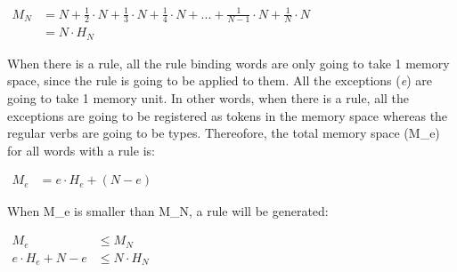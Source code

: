 \begin{exe}
\ex 
$\begin{aligned}
M_N & = N + \frac{1}{2}\cdot N + \frac{1}{3}\cdot N + \frac{1}{4}\cdot N +...+\frac{1}{N-1}\cdot N + \frac{1}{N}\cdot N  &\\
&= N \cdot H_N &
\end{aligned}$
\end{exe}

When there is a rule, all the rule binding words are only going to take 1 memory space, since the rule is going to be applied to them. All the exceptions (\textit{e}) are going to take 1 memory unit. In other words, when there is a rule, all the exceptions are going to be registered as tokens in the memory space whereas the regular verbs are going to be types. Thereofore, the total memory space (M_e) for all words with a rule is:

\begin{exe}
\ex
$\begin{aligned}
M_e & = e \cdot H_e + (N-e) &
\end{aligned}$
\end{exe}

When M_e is smaller than M_N, a rule will be generated:

\begin{exe}
\ex 
$\begin{aligned}
M_e &\leq M_N &\\
e \cdot H_e + N - e &\leq N \cdot H_N
\end{aligned}$
\end{exe}
